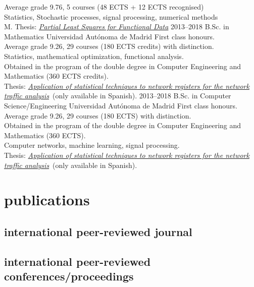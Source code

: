 \documentclass[]{friggeri-cv}
\newcommand{\tfg}[0]{\href{https://repositorio.uam.es/bitstream/handle/10486/688211/perdices_burrero_daniel_tfg.pdf?sequence=1&isAllowed=y}{\emph{Application of statistical techniques to network registers for the network traffic analysis}}}
\begin{document}
\begin{entrylist}
{    Average grade 9.76, 5 courses (48 ECTS + 12 ECTS recognised)\\
    Statistics, Stochastic processes, signal processing, numerical methods\\
    M. Thesis: \href{https://dperdices.github.io/resources/Partial_Least_Squares_for_Functional_Data.pdf}{\emph{Partial Least Squares for Functional Data}}
    }
\entry
    {2013–2018}
    {B.Sc. in Mathematics}
    {Universidad Autónoma de Madrid}
    {First class honours.\\
    Average grade 9.26, 29 courses  (180 ECTS credits) with distinction. \\
    Statistics, mathematical optimization, functional analysis.\\
    Obtained in the program of the double degree in Computer Engineering and Mathematics (360 ECTS credits).\\
    Thesis: \tfg~(only available in Spanish).
    }
\entry
    {2013–2018}
    {B.Sc. in Computer Science/Engineering}
    {Universidad Autónoma de Madrid}
    {First class honours.\\
    Average grade 9.26, 29 courses  (180 ECTS) with distinction. \\
    Obtained in the program of the double degree in Computer Engineering and Mathematics (360 ECTS).\\
    Computer networks, machine learning, signal processing.\\
    Thesis: \tfg~(only available in Spanish).}
\end{entrylist}
\newpage
\section{publications}

\nocite{*}
\subsection{international peer-reviewed journal}
\begin{refsegment}
  \nocite{*}
  \printbibliography[sorting=chronological, type=article, notkeyword={spanish}, heading=none]
\end{refsegment}
\subsection{international peer-reviewed conferences/proceedings}
\begin{refsegment}
  \nocite{*}
  \printbibliography[sorting=chronological, type=inproceedings, notkeyword={spanish}, heading=none]
\end{refsegment}
\end{document}
